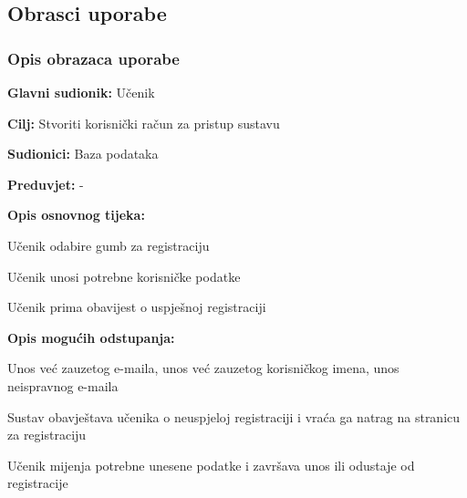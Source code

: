 						
			\subsection{Obrasci uporabe}
					
				\subsubsection{Opis obrazaca uporabe}		

					\noindent {}
					\begin{packed_item}
	
						\item \textbf{Glavni sudionik: }Učenik
						\item  \textbf{Cilj:} Stvoriti korisnički račun za pristup sustavu
						\item  \textbf{Sudionici:} Baza podataka
						\item  \textbf{Preduvjet:} -
						\item  \textbf{Opis osnovnog tijeka:}
						
						\item[] \begin{packed_enum}
	
							\item Učenik odabire gumb za registraciju
							\item Učenik unosi potrebne korisničke podatke
							\item Učenik prima obavijest o uspješnoj registraciji
						\end{packed_enum}
						
						\item  \textbf{Opis mogućih odstupanja:}
						
						\item[] \begin{packed_item}
	
							\item[2.a] Unos već zauzetog e-maila, unos već zauzetog korisničkog imena, unos neispravnog e-maila
							\item[] \begin{packed_enum}
								
								\item Sustav obavještava učenika o neuspjeloj registraciji i vraća ga natrag na stranicu za registraciju
								\item Učenik mijenja potrebne unesene podatke i završava unos ili odustaje od registracije
								
							\end{packed_enum}
							
						\end{packed_item}
					\end{packed_item}

